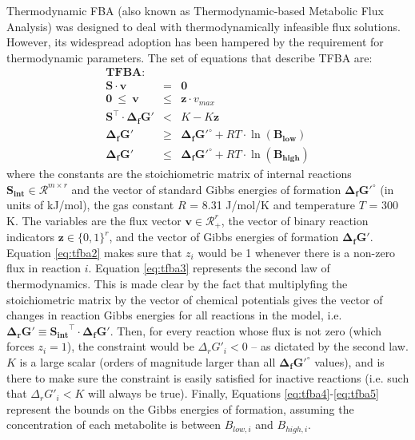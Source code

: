 \documentclass[twocolumn]{article}
\begin{document}
Thermodynamic FBA (also known as Thermodynamic-based Metabolic Flux Analysis) was designed to deal with thermodynamically infeasible flux solutions. However, its widespread adoption has been hampered by the requirement for thermodynamic parameters. The set of equations that describe TFBA are:
\begin{eqnarray}
\textbf{TFBA:~~} && \nonumber\\
\mathbf{S} \cdot \mathbf{v} &=& \mathbf{0}  \label{eq:tfba1} \\
\mathbf{0} ~\leq~ \mathbf{v} &\leq & \mathbf{z} \cdot v_{max} \label{eq:tfba2} \\
\mathbf{S}^\top \cdot \mathbf{\Delta_f G'} &<& K - K\mathbf{z} \label{eq:tfba3} \\
\mathbf{\Delta_f G'}& \geq & \mathbf{\Delta_f G'^\circ} + RT \cdot \ln(\mathbf{B_{low}}) \label{eq:tfba4} \\
\mathbf{\Delta_f G'}& \leq & \mathbf{\Delta_f G'^\circ} + RT \cdot \ln(\mathbf{B_{high}}) \label{eq:tfba5}
\end{eqnarray}
where the constants are the stoichiometric matrix of internal reactions $\mathbf{S_{int}}  \in \mathcal{R}^{m \times r}$  and the vector of standard Gibbs energies of formation $\mathbf{\Delta_f G'^\circ}$ (in units of kJ/mol), the gas constant $R$ = 8.31 J/mol/K and temperature $T$ = 300 K. The variables are the flux vector $\mathbf{v} \in \mathcal{R}_{+}^{r}$, the vector of binary reaction indicators $\mathbf{z} \in \{0,1\}^{r}$, and the vector of Gibbs energies of formation $\mathbf{\Delta_f G'}$. Equation \ref{eq:tfba2} makes sure that $z_i$ would be 1 whenever there is a non-zero flux in reaction $i$. Equation \ref{eq:tfba3} represents the second law of thermodynamics. This is made clear by the fact that multiplyfing the stoichiometric matrix by the vector of chemical potentials gives the vector of changes in reaction Gibbs energies for all reactions in the model, i.e. $\mathbf{\Delta_r G'} \equiv \mathbf{S_{int}}^\top \cdot \mathbf{\Delta_f G'}$. Then, for every reaction whose flux is not zero (which forces $z_i = 1$), the constraint would be $\Delta_r G'_i < 0$ -- as dictated by the second law. $K$ is a large scalar (orders of magnitude larger than all $\mathbf{\Delta_f G'^\circ}$ values), and is there to make sure the constraint is easily satisfied for inactive reactions (i.e. such that $\Delta_r G'_i < K$ will always be true). Finally, Equations \ref{eq:tfba4}-\ref{eq:tfba5} represent the bounds on the Gibbs energies of formation, assuming the concentration of each metabolite is between $B_{low,i}$ and $B_{high,i}$.
\end{document}
